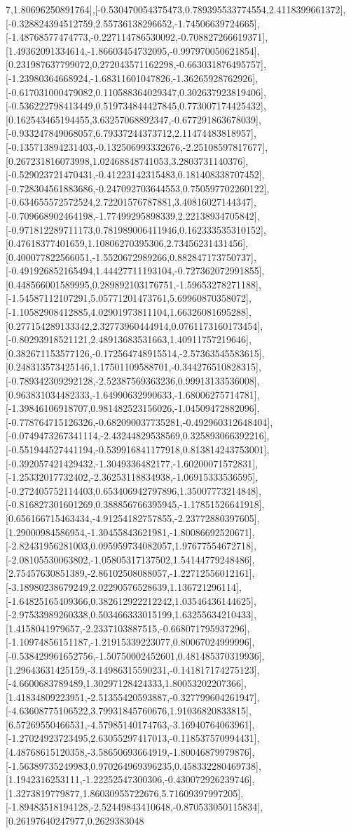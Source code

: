 \documentclass{article}
\begin{document}
7,1.80696250891764],[-0.530470054375473,0.789395533774554,2.4118399661372],[-0.328824394512759,2.55736138296652,-1.74506639724665],[-1.48768577474773,-0.227114786530092,-0.708827266619371],[1.49362091334614,-1.86603454732095,-0.997970050621854],[0.231987637799072,0.272043571162298,-0.663031876495757],[-1.23980364668924,-1.68311601047826,-1.36265928762926],[-0.617031000479082,0.110588364029347,0.302637923819406],[-0.536222798413449,0.519734844427845,0.773007174425432],[0.162543465194455,3.63257068892347,-0.677291863678039],[-0.933247849068057,6.79337244373712,2.11474483818957],[-0.135713894231403,-0.132506993332676,-2.25108597817677],[0.267231816073998,1.02468848741053,3.2803731140376],[-0.529023721470431,-0.41223142315483,0.181408338707452],[-0.728304561883686,-0.247092703644553,0.750597702260122],[-0.634655572572524,2.72201576787881,3.40816027144347],[-0.709668902464198,-1.77499295898339,2.22138934705842],[-0.971812289711173,0.781989006411946,0.162333535310152],[0.47618377401659,1.10806270395306,2.73456231431456],[0.400077822566051,-1.5520672989266,0.882847173750737],[-0.491926852165494,1.44427711193104,-0.727362072991855],[0.448566001589995,0.289892103176751,-1.59653278271188],[-1.54587112107291,5.05771201473761,5.69960870358072],[-1.10582908412885,4.02901973811104,1.66326081695288],[0.277154289133342,2.32773960444914,0.0761173160173454],[-0.80293918521121,2.48913683531663,1.40911757219646],[0.382671153577126,-0.172564748915514,-2.57363545583615],[0.248313573425146,1.17501109588701,-0.344276510828315],[-0.789342309292128,-2.52387569363236,0.99913133536008],[0.963831034482333,-1.64990632990633,-1.68006275714781],[-1.39846106918707,0.981482523156026,-1.04509472882096],[-0.778764715126326,-0.682090037735281,-0.492960312648404],[-0.0749473267341114,-2.43244829538569,0.325893066392216],[-0.551944527441194,-0.539916841177918,0.813814243753001],[-0.392057421429432,-1.3049336482177,-1.60200071572831],[-1.25332017732402,-2.36253118834938,-1.06915333536595],[-0.272405752114403,0.653406942797896,1.35007773214848],[-0.816827301601269,0.388856766395945,-1.17851526641918],[0.656166715463434,-4.91254182757855,-2.23772880397605],[1.29000984586954,-1.30455843621981,-1.80086692520671],[-2.82431956281003,0.095959734082057,1.97677554672718],[-2.08105530063802,-1.05805317137502,1.54144779248486],[2.75457630851389,-2.86102508088057,-1.22712556012161],[-3.18980238679249,2.02290576528639,1.136721296114],[-1.64825165409366,0.382612922212242,1.03546436144625],[-2.97533989260338,0.503466333015199,1.63255634210433],[1.4158041979657,-2.2337103887515,-0.668071795937296],[-1.10974856151187,-1.21915339223077,0.80067024999996],[-0.538429961652756,-1.50750002452601,0.481485370319936],[1.29643631425159,-3.14986315590231,-0.141817174275123],[-4.6600683789489,1.30297128424333,1.80053202207366],[1.41834809223951,-2.51355420593887,-0.327799604261947],[-4.63608775106522,3.79931845760676,1.91036820833815],[6.57269550466531,-4.57985140174763,-3.16940764063961],[-1.27024923723495,2.63055297417013,-0.118537570994431],[4.48768615120358,-3.58650693664919,-1.80046879979876],[-1.56389735249983,0.970264969396235,0.458332280469738],[1.1942316253111,-1.22252547300306,-0.430072926239746],[1.3273819779877,1.86030955722676,5.71609397997205],[-1.89483518194128,-2.52449843410648,-0.870533050115834],[0.26197640247977,0.2629383048
\end{document}

